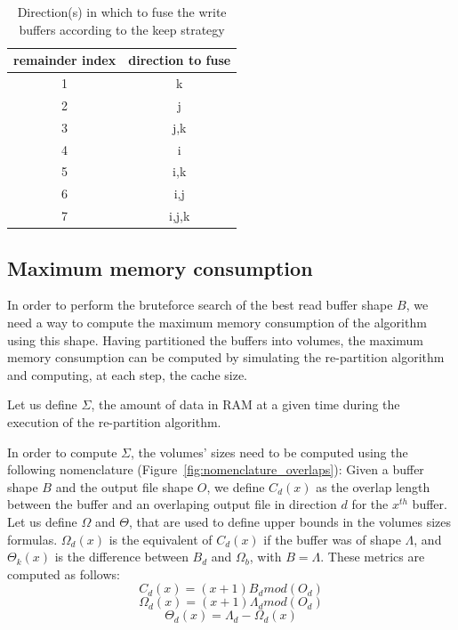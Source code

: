 \documentclass[conference]{IEEEtran}
\begin{document}
\begin{table}[ht]
  \centering
  \caption{Direction(s) in which to fuse the write buffers according to the keep strategy}

   \begin{tabular}[t]{c c }
   \hline
   remainder index & direction to fuse \\
     \hline\hline
     1 & k \\
     \hline
     2 & j \\
     \hline
     3 & j,k \\
     \hline
     4 & i \\
     \hline
     5 & i,k \\
     \hline
     6 & i,j \\
     \hline
     7 & i,j,k \\
     \hline
   \end{tabular}

   \label{tab:fusion}

\end{table}

\subsection{Maximum memory consumption}

In order to perform the bruteforce search of the best read buffer shape $B$,
we need a way to compute the maximum memory consumption of the algorithm using
this shape.
Having partitioned the buffers into volumes, the maximum memory consumption can
be computed by simulating the re-partition algorithm and computing, at each step,
the cache size.

Let us define $\Sigma$, the amount of data in RAM at a given time during the
execution of the re-partition algorithm.

In order to compute $\Sigma$, the volumes' sizes need to be computed using the
following nomenclature (Figure~\ref{fig:nomenclature_overlaps}):
Given a buffer shape $B$ and the output file shape $O$, we define $C_d(x)$ as
the overlap length between the buffer and an overlaping output file in direction
$d$ for the $x^{th}$ buffer. Let us define $\Omega$ and $\Theta$, that are used
to define upper bounds in the volumes sizes formulas. $\Omega_d(x)$ is the
equivalent of $C_d(x)$ if the buffer was of shape $\Lambda$, and $\Theta_k(x)$
is the difference between $B_d$ and $\Omega_b$, with $B=\Lambda$.
These metrics are computed as follows:
$$C_d(x) = (x+1)B_d mod(O_d)$$
$$\Omega_d(x) = (x+1)\Lambda_d mod(O_d)$$
$$\Theta_d(x) = \Lambda_d - \Omega_d(x)$$
\end{document}
